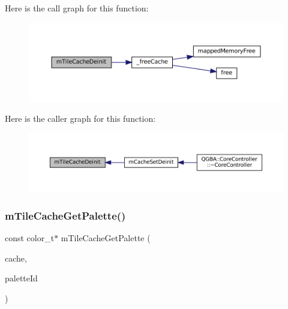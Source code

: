 Here is the call graph for this function\+:
\nopagebreak
\begin{figure}[H]
\begin{center}
\leavevmode
\includegraphics[width=350pt]{tile-cache_8c_a1426fbd1e5ca5db4617a2fc1745e2590_cgraph}
\end{center}
\end{figure}
Here is the caller graph for this function\+:
\nopagebreak
\begin{figure}[H]
\begin{center}
\leavevmode
\includegraphics[width=350pt]{tile-cache_8c_a1426fbd1e5ca5db4617a2fc1745e2590_icgraph}
\end{center}
\end{figure}
\mbox{\label{tile-cache_8c_a1d3812aa56af3faee81d8fd4b9d76213}} 
\subsubsection{\texorpdfstring{m\+Tile\+Cache\+Get\+Palette()}{mTileCacheGetPalette()}}
{\footnotesize\ttfamily const color\+\_\+t$\ast$ m\+Tile\+Cache\+Get\+Palette (\begin{DoxyParamCaption}\item[{struct m\+Tile\+Cache $\ast$}]{cache,  }\item[{unsigned}]{palette\+Id }\end{DoxyParamCaption})}

\mbox{\label{tile-cache_8c_a095b4a1a63027962105a30a6197db22d}} 
